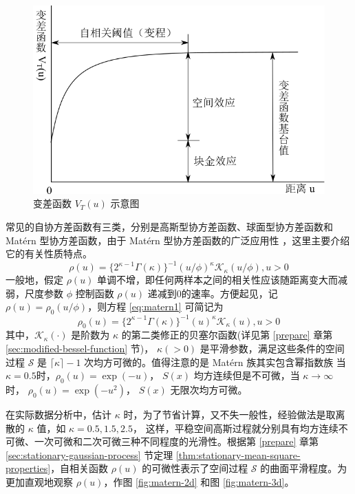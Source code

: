 \documentclass[12pt,a4paper,UTF8,twoside]{book}
\theoremstyle{definition}
\theoremstyle{definition}
\theoremstyle{definition}
\theoremstyle{remark}
\begin{document}
\begin{figure}

{\centering \includegraphics[width=0.7\linewidth]{figures/semi-variance} 

}

\caption{变差函数 $V_{T}(u)$ 示意图}\label{fig:semi-variance}
\end{figure}

常见的自协方差函数有三类，分别是高斯型协方差函数、球面型协方差函数和
Matérn 型协方差函数，由于 Matérn 型协方差函数的广泛应用性
\citep{Diggle1998, Diggle2002Childhood, Christensen2004}，这里主要介绍它的有关性质特点。
\begin{equation}
\rho(u)=\{2^{\kappa -1}\Gamma(\kappa)\}^{-1}(u/\phi)^{\kappa}\mathcal{K}_{\kappa}(u/\phi),u > 0 \label{eq:matern1}
\end{equation} \noindent 一般地，假定 \(\rho(u)\)
单调不增，即任何两样本之间的相关性应该随距离变大而减弱，尺度参数
\(\phi\) 控制函数 \(\rho(u)\) 递减到0的速率。方便起见，记
\(\rho(u) = \rho_{0}(u/\phi)\)，则方程 \eqref{eq:matern1} 可简记为
\begin{equation}
\rho_{0}(u)=\{2^{\kappa -1}\Gamma(\kappa)\}^{-1}(u)^{\kappa}\mathcal{K}_{\kappa}(u),u > 0 \label{eq:matern2}
\end{equation} \noindent 其中，\(\mathcal{K}_{\kappa}(\cdot)\) 是阶数为
\(\kappa\) 的第二类修正的贝塞尔函数(详见第 \ref{prepare}
章第\ref{sec:modified-bessel-function} 节)， \(\kappa(>0)\)
是平滑参数，满足这些条件的空间过程 \(\mathcal{S}\) 是
\(\lceil\kappa\rceil-1\) 次均方可微的。值得注意的是 Matérn
族其实包含幂指数族 \noindent 当
\(\kappa = 0.5\)时，\(\rho_{0}(u) = \exp(-u)\)， \(S(x)\)
均方连续但是不可微，当 \(\kappa \to \infty\) 时，
\(\rho_{0}(u) = \exp(-u^2)\)， \(S(x)\)
无限次均方可微\citep{Diggle2007}。

在实际数据分析中，估计 \(\kappa\)
时，为了节省计算，又不失一般性，经验做法是取离散的 \(\kappa\) 值，如
\(\kappa = 0.5, 1.5, 2.5\)，
这样，平稳空间高斯过程就分别具有均方连续不可微、一次可微和二次可微三种不同程度的光滑性。根据第
\ref{prepare} 章第 \ref{sec:stationary-gaussian-process} 节定理
\ref{thm:stationary-mean-square-properties}，自相关函数 \(\rho(u)\)
的可微性表示了空间过程 \(\mathcal{S}\) 的曲面平滑程度。为更加直观地观察
\(\rho(u)\)，作图 \ref{fig:matern-2d} 和图 \ref{fig:matern-3d}。
\end{document}
